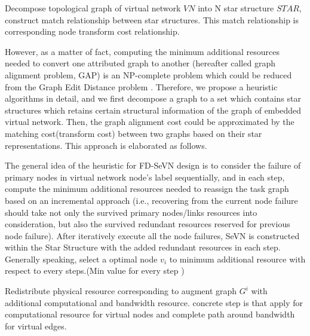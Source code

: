 Decompose topological graph of  virtual network $VN$ into N star structure $STAR$, construct match relationship between star structures. This match relationship is corresponding node transform cost relationship.

However, as a matter of fact, computing the minimum additional resources needed to convert one attributed graph to another (hereafter called graph alignment problem, GAP) is an NP-complete problem which could be reduced from the Graph Edit Distance problem \cite{justice2006binary}. Therefore, we propose a heuristic algorithms in detail, and we first decompose a graph to a set which contains star structures which retains certain structural information of the graph of embedded virtual network. Then, the graph alignment cost could be approximated by the matching cost(transform cost) between two graphs based on their star representations. This approach is elaborated as follows.


The general idea of the heuristic for FD-SeVN design is to consider the failure of primary nodes in virtual network node's label sequentially, and in each step, compute the minimum additional resources needed to reassign the task graph based on an incremental approach (i.e., recovering from the current node failure should take not only the survived primary nodes/links resources into consideration, but also the survived redundant resources reserved for previous node failure). After iteratively execute all the node failures, SeVN is constructed within the Star Structure with the added redundant resources in each step. Generally speaking, select a optimal node $v_i$ to minimum additional resource with respect to every steps.(Min value for every step )



Redistribute physical resource corresponding to augment graph $G^i$  with additional computational and bandwidth resource. concrete step is that apply for computational resource for virtual nodes and complete path around bandwidth for virtual edges.




